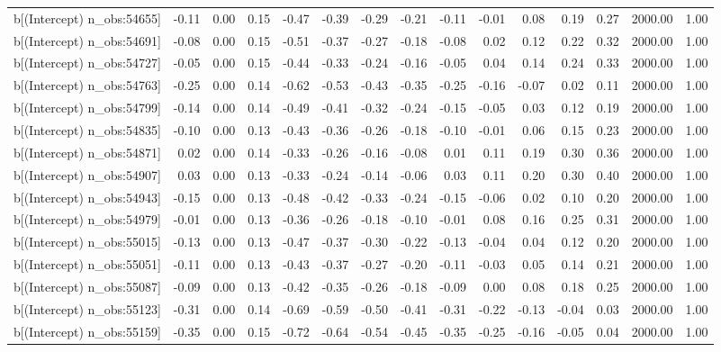 \begin{table}[ht]
\begin{tabular}{rrrrrrrrrrrrrrr}
  b[(Intercept) n\_obs:54655] & -0.11 & 0.00 & 0.15 & -0.47 & -0.39 & -0.29 & -0.21 & -0.11 & -0.01 & 0.08 & 0.19 & 0.27 & 2000.00 & 1.00 \\ 
  b[(Intercept) n\_obs:54691] & -0.08 & 0.00 & 0.15 & -0.51 & -0.37 & -0.27 & -0.18 & -0.08 & 0.02 & 0.12 & 0.22 & 0.32 & 2000.00 & 1.00 \\ 
  b[(Intercept) n\_obs:54727] & -0.05 & 0.00 & 0.15 & -0.44 & -0.33 & -0.24 & -0.16 & -0.05 & 0.04 & 0.14 & 0.24 & 0.33 & 2000.00 & 1.00 \\ 
  b[(Intercept) n\_obs:54763] & -0.25 & 0.00 & 0.14 & -0.62 & -0.53 & -0.43 & -0.35 & -0.25 & -0.16 & -0.07 & 0.02 & 0.11 & 2000.00 & 1.00 \\ 
  b[(Intercept) n\_obs:54799] & -0.14 & 0.00 & 0.14 & -0.49 & -0.41 & -0.32 & -0.24 & -0.15 & -0.05 & 0.03 & 0.12 & 0.19 & 2000.00 & 1.00 \\ 
  b[(Intercept) n\_obs:54835] & -0.10 & 0.00 & 0.13 & -0.43 & -0.36 & -0.26 & -0.18 & -0.10 & -0.01 & 0.06 & 0.15 & 0.23 & 2000.00 & 1.00 \\ 
  b[(Intercept) n\_obs:54871] & 0.02 & 0.00 & 0.14 & -0.33 & -0.26 & -0.16 & -0.08 & 0.01 & 0.11 & 0.19 & 0.30 & 0.36 & 2000.00 & 1.00 \\ 
  b[(Intercept) n\_obs:54907] & 0.03 & 0.00 & 0.13 & -0.33 & -0.24 & -0.14 & -0.06 & 0.03 & 0.11 & 0.20 & 0.30 & 0.40 & 2000.00 & 1.00 \\ 
  b[(Intercept) n\_obs:54943] & -0.15 & 0.00 & 0.13 & -0.48 & -0.42 & -0.33 & -0.24 & -0.15 & -0.06 & 0.02 & 0.10 & 0.20 & 2000.00 & 1.00 \\ 
  b[(Intercept) n\_obs:54979] & -0.01 & 0.00 & 0.13 & -0.36 & -0.26 & -0.18 & -0.10 & -0.01 & 0.08 & 0.16 & 0.25 & 0.31 & 2000.00 & 1.00 \\ 
  b[(Intercept) n\_obs:55015] & -0.13 & 0.00 & 0.13 & -0.47 & -0.37 & -0.30 & -0.22 & -0.13 & -0.04 & 0.04 & 0.12 & 0.20 & 2000.00 & 1.00 \\ 
  b[(Intercept) n\_obs:55051] & -0.11 & 0.00 & 0.13 & -0.43 & -0.37 & -0.27 & -0.20 & -0.11 & -0.03 & 0.05 & 0.14 & 0.21 & 2000.00 & 1.00 \\ 
  b[(Intercept) n\_obs:55087] & -0.09 & 0.00 & 0.13 & -0.42 & -0.35 & -0.26 & -0.18 & -0.09 & 0.00 & 0.08 & 0.18 & 0.25 & 2000.00 & 1.00 \\ 
  b[(Intercept) n\_obs:55123] & -0.31 & 0.00 & 0.14 & -0.69 & -0.59 & -0.50 & -0.41 & -0.31 & -0.22 & -0.13 & -0.04 & 0.03 & 2000.00 & 1.00 \\ 
  b[(Intercept) n\_obs:55159] & -0.35 & 0.00 & 0.15 & -0.72 & -0.64 & -0.54 & -0.45 & -0.35 & -0.25 & -0.16 & -0.05 & 0.04 & 2000.00 & 1.00 \\ 

\end{tabular}
\end{table}
